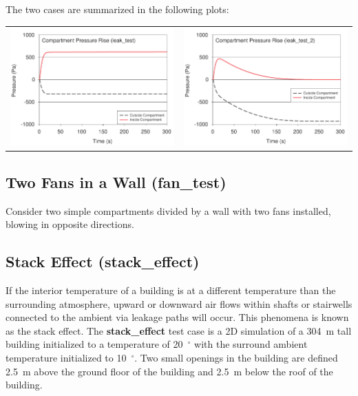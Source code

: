 \documentclass[11pt]{book}
\begin{document}
The two cases are summarized in the following plots:

\vspace{0.1in}
\noindent
\begin{tabular*}{\textwidth}{lr}
\includegraphics[width=3.1in]{FIGURES/leak_test_Pressure_Case_1} &
\includegraphics[width=3.1in]{FIGURES/leak_test_Pressure_Case_2}
\end{tabular*}

\clearpage


\subsection{Two Fans in a Wall ({\bf fan\_test})  }

Consider two simple compartments divided by a wall with two fans installed, blowing in opposite directions.



\clearpage

\subsection{Stack Effect ({\bf stack\_effect})  }

If the interior temperature of a building is at a different temperature than the surrounding atmosphere, upward or
downward air flows within shafts or stairwells connected to the ambient via leakage paths will occur.  This
phenomena is known as the stack effect.  The {\bf stack\_effect} test case is a 2D simulation of a 304~m tall building
initialized to a temperature of 20~$^\circ$ with the surround ambient temperature initialized to 10~$^\circ$.
Two small openings in the building are defined 2.5~m above the ground floor of the building and 2.5~m below the
roof of the building.
\end{document}
